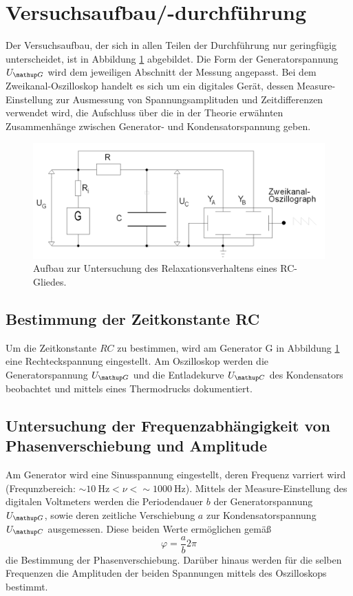 \section{Versuchsaufbau/-durchführung}
Der Versuchsaufbau, der sich in allen Teilen der Durchführung nur geringfügig unterscheidet, ist in Abbildung \ref{fig: aufbau} abgebildet.
Die Form der Generatorspannung $U\ua{G}$ wird dem jeweiligen Abschnitt der Messung angepasst. Bei dem Zweikanal-Oszilloskop handelt es sich um ein
digitales Gerät, dessen Measure-Einstellung zur Ausmessung von Spannungsamplituden und Zeitdifferenzen verwendet wird, die Aufschluss über
die in der Theorie erwähnten Zusammenhänge zwischen Generator- und Kondensatorspannung geben.
\begin{figure}
  \centering
  \includegraphics[width = \textwidth]{pics/aufbau.png}
  \caption{Aufbau zur Untersuchung des Relaxationsverhaltens eines RC-Gliedes.}
  \label{fig: aufbau}
\end{figure}

\subsection{Bestimmung der Zeitkonstante RC}
Um die Zeitkonstante $RC$ zu bestimmen, wird am Generator G in Abbildung \ref{fig: aufbau} eine Rechteckspannung eingestellt.
Am Oszilloskop werden die Generatorspannung $U\ua{G}$ und die Entladekurve $U\ua{C}$ des Kondensators beobachtet und mittels eines Thermodrucks
dokumentiert.

\subsection{Untersuchung der Frequenzabhängigkeit von Phasenverschiebung und Amplitude}
Am Generator wird eine Sinusspannung eingestellt, deren Frequenz varriert wird (Frequnzbereich: $\sim\SI{10}{\hertz}<\nu< \sim\SI{1000}{\hertz}$).
Mittels der Measure-Einstellung des digitalen Voltmeters werden die Periodendauer $b$ der
Generatorspannung $U\ua{G}$, sowie deren zeitliche Verschiebung $a$ zur Kondensatorspannung $U\ua{C}$ ausgemessen. Diese beiden Werte ermöglichen gemäß
\begin{equation}
  \varphi = \frac{a}{b}2\pi
  \label{eq:phasenverschiebung}
\end{equation}
die Bestimmung der Phasenverschiebung. Darüber hinaus werden für die selben Frequenzen die Amplituden der beiden Spannungen mittels des Oszilloskops
bestimmt.

